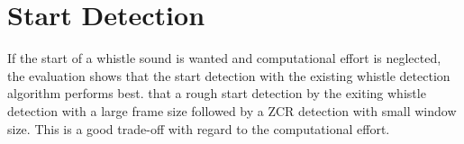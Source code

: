 \section{Start Detection}
\label{sec:05_startDetection}

If the start of a whistle sound is wanted and computational effort is
neglected, the evaluation shows that the start detection with the
existing whistle detection algorithm performs best.
that a rough start detection by the exiting whistle detection
with a large frame size followed by a \ac{ZCR} detection with small
window size.
This is a good trade-off with regard to the computational effort.
